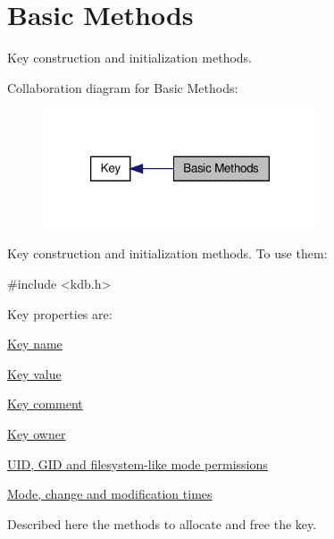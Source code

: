 \hypertarget{group__key__basic}{\section{Basic Methods}
\label{group__key__basic}
}


Key construction and initialization methods.  


Collaboration diagram for Basic Methods\-:\nopagebreak
\begin{figure}[H]
\begin{center}
\leavevmode
\includegraphics[width=230pt]{group__key__basic}
\end{center}
\end{figure}
Key construction and initialization methods. To use them\-: 
\begin{DoxyCode}
\textcolor{preprocessor}{#include <kdb.h>}
\end{DoxyCode}


Key properties are\-:
\begin{DoxyItemize}
\item \hyperlink{group__keyname}{Key name }
\item \hyperlink{group__keyvalue}{Key value }
\item \hyperlink{group__keyvalue_gafb89735689929ff717cc9f2d0d0b46a2}{Key comment }
\item \hyperlink{group__keyname_ga35922a017bee8b4bcb493bbdfad9d6f5}{Key owner }
\item \hyperlink{group__keymeta}{U\-I\-D, G\-I\-D and filesystem-\/like mode permissions }
\item \hyperlink{group__keymeta}{Mode, change and modification times }
\end{DoxyItemize}

Described here the methods to allocate and free the key. 